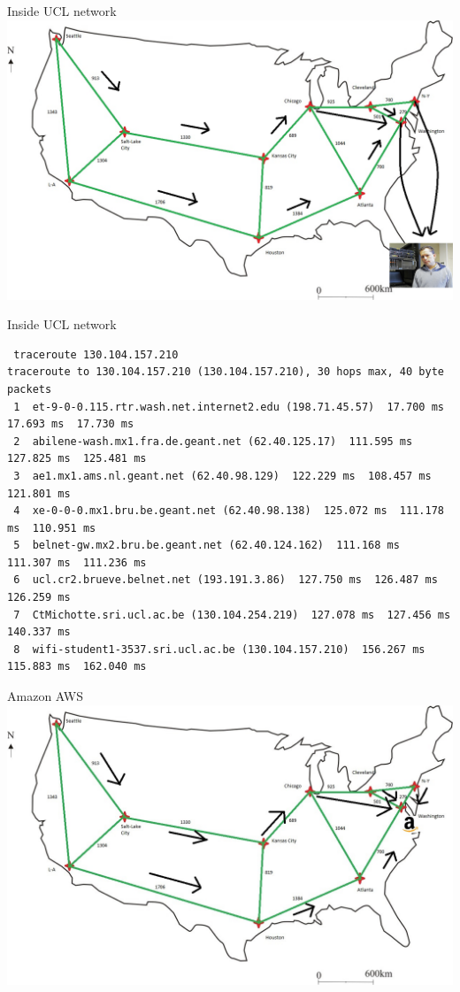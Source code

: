 \documentclass[usenames,dvipsnames]{beamer}
\begin{document}
\begin{frame}{Inside UCL network}
\includegraphics[width=\textwidth]{ucl_carte.png}
\end{frame}

\begin{frame}[fragile]{Inside UCL network}
\begin{lstlisting}
 traceroute 130.104.157.210 
traceroute to 130.104.157.210 (130.104.157.210), 30 hops max, 40 byte packets
 1  et-9-0-0.115.rtr.wash.net.internet2.edu (198.71.45.57)  17.700 ms  17.693 ms  17.730 ms
 2  abilene-wash.mx1.fra.de.geant.net (62.40.125.17)  111.595 ms  127.825 ms  125.481 ms
 3  ae1.mx1.ams.nl.geant.net (62.40.98.129)  122.229 ms  108.457 ms  121.801 ms
 4  xe-0-0-0.mx1.bru.be.geant.net (62.40.98.138)  125.072 ms  111.178 ms  110.951 ms
 5  belnet-gw.mx2.bru.be.geant.net (62.40.124.162)  111.168 ms  111.307 ms  111.236 ms
 6  ucl.cr2.brueve.belnet.net (193.191.3.86)  127.750 ms  126.487 ms  126.259 ms
 7  CtMichotte.sri.ucl.ac.be (130.104.254.219)  127.078 ms  127.456 ms  140.337 ms
 8  wifi-student1-3537.sri.ucl.ac.be (130.104.157.210)  156.267 ms  115.883 ms  162.040 ms

\end{lstlisting}
\end{frame}


\begin{frame}{Amazon AWS}
\includegraphics[width=\textwidth]{map_amazone.jpg}
\end{frame}
\end{document}
